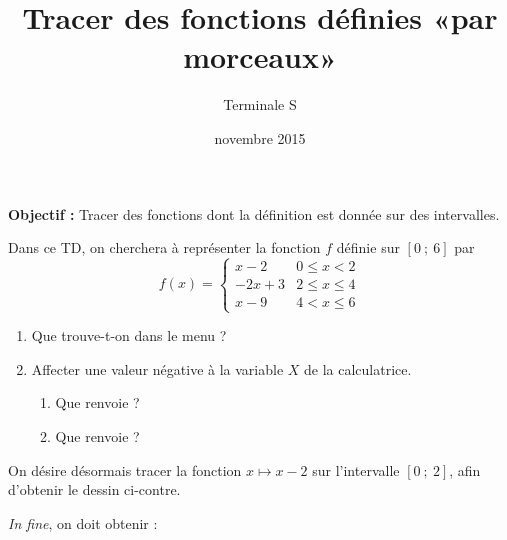 \documentclass[10pt,a4paper]{article}
\title{Tracer des fonctions définies «par morceaux»}
\author{Terminale S}
\date{novembre 2015}
\makeatletter
\renewcommand{\maketitle}%
{\framebox{%
    \begin{minipage}{1.0\linewidth}%
      \begin{center}%
        \Large \@title ~-- \@author \\%
        \@date%
      \end{center}%
    \end{minipage}}%
  \normalsize%
}
\newcommand{\inff}[2]{\left[#1~;~#2\right]}
\theoremstyle{break}
\theoremstyle{plain}
\theoremstyle{nonumberplain}
\theoremstyle{nonumberbreak}
\makeatother
\begin{document}
\maketitle

\bigskip

\textbf{Objectif :} Tracer des fonctions dont la définition est donnée
sur des intervalles.

Dans ce TD, on cherchera à représenter la fonction $f$ définie sur
$\inff{0}{6}$ par \[ f(x) = \left\lbrace\begin{array}{lr}x-2 & 0
\leqslant x < 2 \\ -2x + 3 & 2 \leqslant x \leqslant 4 \\ x - 9 & 4 < x
\leqslant 6 \end{array}\right. \]

\begin{enumerate}
  \item Que trouve-t-on dans le menu \Touche[style=second]
    \Touche[style=function, principal=math, second=tests, alpha=A] ?
  \item Affecter une valeur négative à la variable $X$ de la
    calculatrice.
    \begin{enumerate}
      \item Que renvoie  ?
      \item Que renvoie  ?
    \end{enumerate}
\end{enumerate}

On désire désormais tracer la fonction $x\mapsto x-2$ sur l'intervalle
$\inff{0}{2}$, afin d'obtenir le dessin ci-contre.

\begin{center}
\end{center}

\textit{In fine}, on doit obtenir :
\begin{center}
\end{center}
\end{document}
